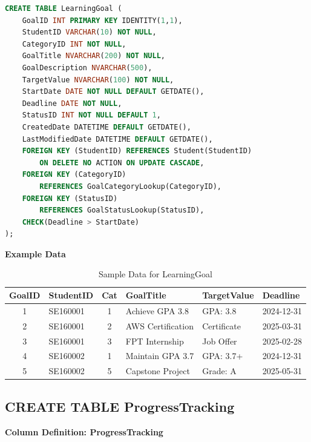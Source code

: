 \documentclass[12pt,a4paper]{report}
\begin{document}
\begin{lstlisting}[language=SQL, caption=Create Table LearningGoal]
CREATE TABLE LearningGoal (
    GoalID INT PRIMARY KEY IDENTITY(1,1),
    StudentID VARCHAR(10) NOT NULL,
    CategoryID INT NOT NULL, 
    GoalTitle NVARCHAR(200) NOT NULL,
    GoalDescription NVARCHAR(500),
    TargetValue NVARCHAR(100) NOT NULL,
    StartDate DATE NOT NULL DEFAULT GETDATE(),
    Deadline DATE NOT NULL,
    StatusID INT NOT NULL DEFAULT 1,
    CreatedDate DATETIME DEFAULT GETDATE(),
    LastModifiedDate DATETIME DEFAULT GETDATE(),
    FOREIGN KEY (StudentID) REFERENCES Student(StudentID) 
        ON DELETE NO ACTION ON UPDATE CASCADE,
    FOREIGN KEY (CategoryID) 
        REFERENCES GoalCategoryLookup(CategoryID),
    FOREIGN KEY (StatusID) 
        REFERENCES GoalStatusLookup(StatusID),
    CHECK(Deadline > StartDate)
);
\end{lstlisting}
\vspace{0.5cm}
\textbf{Example Data}
\begin{table}[ht]
\centering
\small
\begin{tabular}{|c|l|c|p{4cm}|l|l|}
\hline
\textbf{GoalID} & \textbf{StudentID} & \textbf{Cat} & \textbf{GoalTitle} & \textbf{TargetValue} & \textbf{Deadline} \\ \hline
1 & SE160001 & 1 & Achieve GPA 3.8 & GPA: 3.8 & 2024-12-31 \\ \hline
2 & SE160001 & 2 & AWS Certification & Certificate & 2025-03-31 \\ \hline
3 & SE160001 & 3 & FPT Internship & Job Offer & 2025-02-28 \\ \hline
4 & SE160002 & 1 & Maintain GPA 3.7 & GPA: 3.7+ & 2024-12-31 \\ \hline
5 & SE160002 & 5 & Capstone Project & Grade: A & 2025-05-31 \\ \hline
\end{tabular}
\caption{Sample Data for LearningGoal}
\label{tab:learning_goal_data}
\end{table}
\vspace{3cm}
\subsection{CREATE TABLE ProgressTracking}

\textbf{Column Definition: ProgressTracking}
\end{document}
